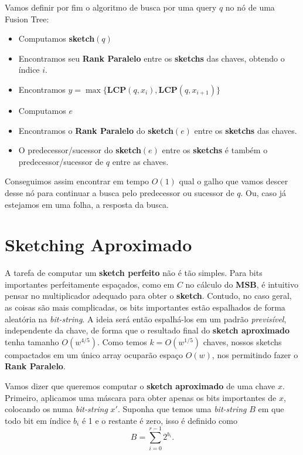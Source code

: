 Vamos definir por fim o algoritmo de busca por uma query $q$ no nó de uma Fusion
Tree:

\begin{itemize}
    \item Computamos \textbf{sketch}$(q)$
    \item Encontramos seu \textbf{Rank Paralelo} entre os \textbf{sketchs} das
    chaves, obtendo o índice $i$.
    \item Encontramos $y= \max\{\textbf{LCP}(q, x_i),\textbf{LCP}(q, x_{i+1})\}$
    \item Computamos $e$
    \item Encontramos o \textbf{Rank Paralelo} do \textbf{sketch}$(e)$ entre os
    \textbf{sketchs} das chaves.
    \item O predecessor/sucessor do \textbf{sketch}$(e)$ entre os
    \textbf{sketchs} é também o predecessor/sucessor de $q$ entre as chaves.
\end{itemize}

Conseguimos assim encontrar em tempo $O(1)$ qual o galho que vamos descer desse
nó para continuar a busca pelo predecessor ou sucessor de $q$. Ou, caso já
estejamos em uma folha, a resposta da busca.

\section{Sketching Aproximado}

A tarefa de computar um \textbf{sketch perfeito} não é tão simples. Para bits
importantes perfeitamente espaçados, como em $C$ no cálculo do \textbf{MSB}, é
intuitivo pensar no multiplicador adequado para obter o \textbf{sketch}.
Contudo, no caso geral, as coisas são mais complicadas, os bits importantes
estão espalhados de forma aleatória na \textit{bit-string}. A ideia será então
espalhá-los em um padrão \textit{previsível}, independente da chave, de forma
que o resultado final do \textbf{sketch aproximado} tenha tamanho $O(w^{4/5})$.
Como temos $k=O(w^{1/5})$ chaves, nossos sketchs compactados em um único array
ocuparão espaço $O(w)$, nos permitindo fazer o \textbf{Rank Paralelo}.

Vamos dizer que queremos computar o \textbf{sketch aproximado} de uma chave $x$.
Primeiro, aplicamos uma máscara para obter apenas os bits importantes de $x$,
colocando os numa \textit{bit-string} $x'$. Suponha que temos uma
\textit{bit-string} $B$ em que todo bit em índice $b_i$ é 1 e o restante é zero,
isso é definido como
\[
B=\sum_{i=0}^{r-1}2^{b_i}.
\]

